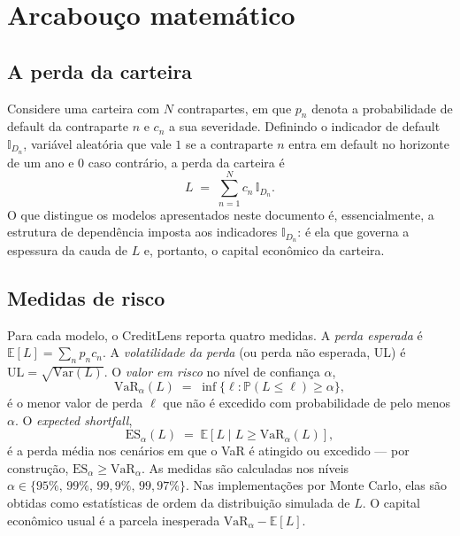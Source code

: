 \documentclass[11pt,a4paper]{article}
\newcommand{\VaR}{\mathrm{VaR}}
\newcommand{\ES}{\mathrm{ES}}
\newcommand{\E}{\mathbb{E}}
\newcommand{\Prob}{\mathbb{P}}
\newcommand{\Ind}{\mathbb{I}}
\begin{document}
\section{Arcabouço matemático}

\subsection{A perda da carteira}

Considere uma carteira com $N$ contrapartes, em que $p_n$ denota a probabilidade de default da contraparte $n$ e $c_n$ a sua severidade. Definindo o indicador de default $\Ind_{D_n}$, variável aleatória que vale $1$ se a contraparte $n$ entra em default no horizonte de um ano e $0$ caso contrário, a perda da carteira é
\begin{equation}
L \;=\; \sum_{n=1}^{N} c_n\,\Ind_{D_n}.
\label{eq:loss}
\end{equation}
O que distingue os modelos apresentados neste documento é, essencialmente, a estrutura de dependência imposta aos indicadores $\Ind_{D_n}$: é ela que governa a espessura da cauda de $L$ e, portanto, o capital econômico da carteira.

\subsection{Medidas de risco}

Para cada modelo, o CreditLens reporta quatro medidas. A \emph{perda esperada} é $\E[L]=\sum_n p_n c_n$. A \emph{volatilidade da perda} (ou perda não esperada, UL) é $\mathrm{UL}=\sqrt{\mathrm{Var}(L)}$. O \emph{valor em risco} no nível de confiança $\alpha$,
\begin{equation}
\VaR_\alpha(L) \;=\; \inf\{\ell : \Prob(L\le \ell)\ge\alpha\},
\end{equation}
é o menor valor de perda $\ell$ que não é excedido com probabilidade de pelo menos $\alpha$. O \emph{expected shortfall},
\begin{equation}
\ES_\alpha(L) \;=\; \E\!\left[L \mid L \ge \VaR_\alpha(L)\right],
\end{equation}
é a perda média nos cenários em que o VaR é atingido ou excedido --- por construção, $\ES_\alpha \ge \VaR_\alpha$. As medidas são calculadas nos níveis $\alpha\in\{95\%,\,99\%,\,99{,}9\%,\,99{,}97\%\}$. Nas implementações por Monte Carlo, elas são obtidas como estatísticas de ordem da distribuição simulada de $L$. O capital econômico usual é a parcela inesperada $\VaR_\alpha - \E[L]$.
\end{document}
